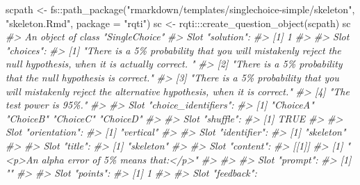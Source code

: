 \documentclass[twoside]{tufte-book}
\newenvironment{Shaded}{}{}
\newcommand{\AttributeTok}[1]{\textcolor[rgb]{0.49,0.56,0.16}{#1}}
\newcommand{\CommentTok}[1]{\textcolor[rgb]{0.38,0.63,0.69}{\textit{#1}}}
\newcommand{\FunctionTok}[1]{\textcolor[rgb]{0.02,0.16,0.49}{#1}}
\newcommand{\NormalTok}[1]{#1}
\newcommand{\OtherTok}[1]{\textcolor[rgb]{0.00,0.44,0.13}{#1}}
\newcommand{\SpecialCharTok}[1]{\textcolor[rgb]{0.25,0.44,0.63}{#1}}
\newcommand{\StringTok}[1]{\textcolor[rgb]{0.25,0.44,0.63}{#1}}
\begin{document}
\begin{Shaded}
\begin{Highlighting}[]
\NormalTok{scpath }\OtherTok{\textless{}{-}}\NormalTok{ fs}\SpecialCharTok{::}\FunctionTok{path\_package}\NormalTok{(}\StringTok{"rmarkdown/templates/singlechoice{-}simple/skeleton"}\NormalTok{, }
                           \StringTok{"skeleton.Rmd"}\NormalTok{, }\AttributeTok{package =} \StringTok{"rqti"}\NormalTok{)}
\NormalTok{sc }\OtherTok{\textless{}{-}}\NormalTok{ rqti}\SpecialCharTok{:::}\FunctionTok{create\_question\_object}\NormalTok{(scpath)}
\NormalTok{sc}
\CommentTok{\#\textgreater{} An object of class "SingleChoice"}
\CommentTok{\#\textgreater{} Slot "solution":}
\CommentTok{\#\textgreater{} [1] 1}
\CommentTok{\#\textgreater{} }
\CommentTok{\#\textgreater{} Slot "choices":}
\CommentTok{\#\textgreater{} [1] "There is a 5\% probability that you will mistakenly reject the null hypothesis,}
\CommentTok{when it is actually correct. "}
\CommentTok{\#\textgreater{} [2] "There is a 5\% probability that the null hypothesis is correct."                                              }
\CommentTok{\#\textgreater{} [3] "There is a 5\% probability that you will mistakenly reject the alternative}
\CommentTok{hypothesis, when it is correct."   }
\CommentTok{\#\textgreater{} [4] "The test power is 95\%."                                                                                      }
\CommentTok{\#\textgreater{} }
\CommentTok{\#\textgreater{} Slot "choice\_identifiers":}
\CommentTok{\#\textgreater{} [1] "ChoiceA" "ChoiceB" "ChoiceC" "ChoiceD"}
\CommentTok{\#\textgreater{} }
\CommentTok{\#\textgreater{} Slot "shuffle":}
\CommentTok{\#\textgreater{} [1] TRUE}
\CommentTok{\#\textgreater{} }
\CommentTok{\#\textgreater{} Slot "orientation":}
\CommentTok{\#\textgreater{} [1] "vertical"}
\CommentTok{\#\textgreater{} }
\CommentTok{\#\textgreater{} Slot "identifier":}
\CommentTok{\#\textgreater{} [1] "skeleton"}
\CommentTok{\#\textgreater{} }
\CommentTok{\#\textgreater{} Slot "title":}
\CommentTok{\#\textgreater{} [1] "skeleton"}
\CommentTok{\#\textgreater{} }
\CommentTok{\#\textgreater{} Slot "content":}
\CommentTok{\#\textgreater{} [[1]]}
\CommentTok{\#\textgreater{} [1] "\textless{}p\textgreater{}An alpha error of 5\% means that:\textless{}/p\textgreater{}"}
\CommentTok{\#\textgreater{} }
\CommentTok{\#\textgreater{} }
\CommentTok{\#\textgreater{} Slot "prompt":}
\CommentTok{\#\textgreater{} [1] ""}
\CommentTok{\#\textgreater{} }
\CommentTok{\#\textgreater{} Slot "points":}
\CommentTok{\#\textgreater{} [1] 1}
\CommentTok{\#\textgreater{} }
\CommentTok{\#\textgreater{} Slot "feedback":}

\end{Highlighting}
\end{Shaded}
\end{document}
